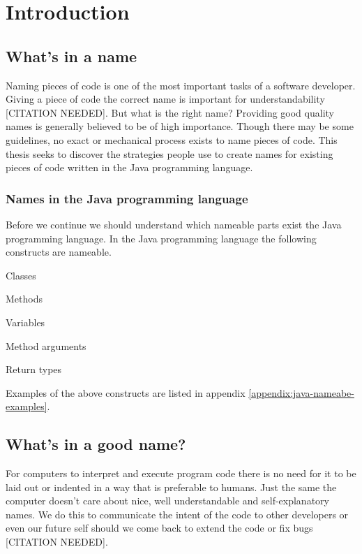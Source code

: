 \section{Introduction}

\subsection{What's in a name}

Naming pieces of code is one of the most important tasks of a software developer. Giving a piece of code the correct name is important for understandability {\color{red}[CITATION NEEDED]}. But what is the right name? Providing good quality names is generally believed to be of high importance. Though there may be some guidelines, no exact or mechanical process exists to name pieces of code. This thesis seeks to discover the strategies people use to create names for existing pieces of code written in the Java programming language.

\subsubsection{Names in the Java programming language}


Before we continue we should understand which nameable parts exist the Java programming language.
In the Java programming language the following constructs are nameable.\cite{javaLangSpec}

\begin{list}{-}{}
\item Classes
\item Methods
\item Variables
\item Method arguments
\item Return types
\end{list}

Examples of the above constructs are listed in appendix \ref{appendix:java-nameabe-examples}.

\subsection{What's in a good name?}

For computers to interpret and execute program code there is no need for it to be laid out or indented in a way that is preferable to humans. Just the same the computer doesn't care about nice, well understandable and self-explanatory names. We do this to communicate the intent of the code to other developers or even our future self should we come back to extend the code or fix bugs {\color{red}[CITATION NEEDED]}.

